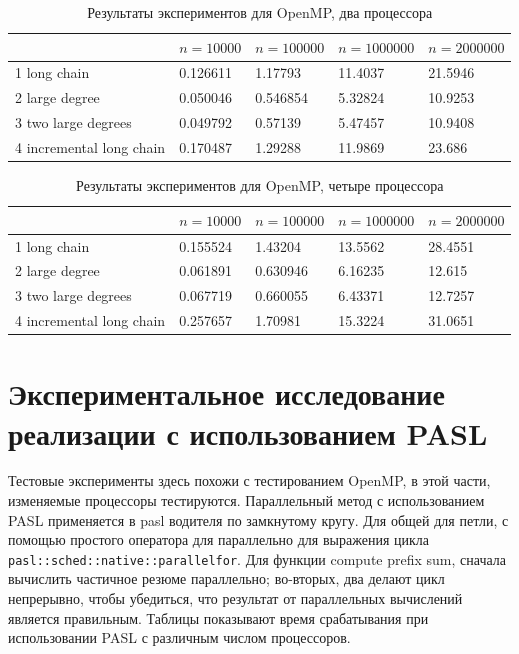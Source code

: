 \documentclass[specification,annotation]{itmo-student-thesis}
\newcommand{\revise}[1]{{\color{red!70!black} #1 }}
\begin{document}
\begin{table}[!ht]
\centering
\begin{tabular}{|l|l|l|l|l|}\hline
 & $n=10000$ & $n=100000$ & $n=1000000$ & $n=2000000$ \\\hline
1 long chain & 0.126611 & 1.17793 & 11.4037 & 21.5946 \\\hline
2 large degree & 0.050046 & 0.546854 & 5.32824 & 10.9253 \\\hline
3 two large degrees & 0.049792 & 0.57139 & 5.47457 & 10.9408 \\\hline
4 incremental long chain & 0.170487 & 1.29288 & 11.9869 & 23.686 \\\hline
\end{tabular}
\caption{Результаты экспериментов для OpenMP, два процессора}\label{tbl:results-openmp-2}
\end{table}

\begin{table}[!ht]
\centering
\begin{tabular}{|l|l|l|l|l|}\hline
 & $n=10000$ & $n=100000$ & $n=1000000$ & $n=2000000$ \\\hline
1 long chain & 0.155524 & 1.43204 & 13.5562 & 28.4551 \\\hline
2 large degree & 0.061891 & 0.630946 & 6.16235 & 12.615 \\\hline
3 two large degrees & 0.067719 & 0.660055 & 6.43371 & 12.7257 \\\hline
4 incremental long chain & 0.257657 & 1.70981 & 15.3224 & 31.0651 \\\hline
\end{tabular}
\caption{Результаты экспериментов для OpenMP, четыре процессора}\label{tbl:results-openmp-4}
\end{table}

\section{Экспериментальное исследование реализации с использованием PASL}

\revise{
Тестовые эксперименты здесь похожи с тестированием OpenMP, в этой части, изменяемые процессоры тестируются. Параллельный метод с использованием PASL применяется в pasl водителя по замкнутому кругу. Для 
общей для петли, с помощью простого оператора для параллельно для выражения цикла \texttt{pasl::sched::native::parallel{\textunderscore}for}. Для функции compute prefix sum, сначала вычислить частичное 
резюме параллельно; 
во-вторых, два делают цикл непрерывно, чтобы убедиться, что результат от параллельных вычислений является правильным. Таблицы показывают время срабатывания при использовании PASL с различным числом 
процессоров.
}
\end{document}

